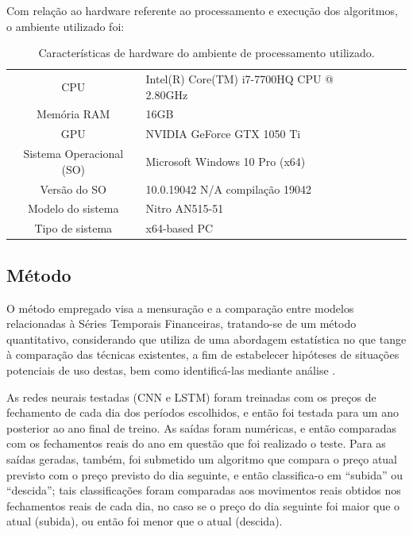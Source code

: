 \par{
Com relação ao hardware referente ao processamento e execução dos algoritmos, o ambiente utilizado foi:}


\begin{table}[htp]
\footnotesize
\centering
\caption{Características de hardware do ambiente de processamento utilizado.}
\begin{tabular}{llcll}
\cline{1-2}
\multicolumn{1}{c|}{CPU} & Intel(R) Core(TM) i7-7700HQ CPU @ 2.80GHz & \textbf{} &  &  \\
\multicolumn{1}{c|}{Memória RAM} & 16GB &  &  &  \\
\multicolumn{1}{c|}{GPU} & NVIDIA GeForce GTX 1050 Ti &  &  &  \\
\multicolumn{1}{c|}{Sistema Operacional (SO)} & Microsoft Windows 10 Pro (x64) &  &  &  \\
\multicolumn{1}{c|}{Versão do SO} & 10.0.19042 N/A compilação 19042 &  &  &  \\
\multicolumn{1}{c|}{Modelo do sistema} & Nitro AN515-51 &  &  &  \\
\multicolumn{1}{c|}{Tipo de sistema} & x64-based PC &  &  &  \\ \cline{1-2}
\end{tabular}
\end{table}


\subsection{\textbf{Método}}

\par
O método empregado visa a mensuração e a comparação entre modelos relacionadas à Séries Temporais Financeiras, tratando-se de um método quantitativo, considerando que utiliza de uma abordagem estatística no que tange à comparação das técnicas existentes, a fim de estabelecer hipóteses de situações potenciais de uso destas, bem como identificá-las mediante análise \cite{wainer}.

\par
As redes neurais testadas (CNN e LSTM) foram treinadas com os preços de fechamento de cada dia dos períodos escolhidos, e então foi testada para um ano posterior ao ano final de treino. As saídas foram numéricas, e então comparadas com os fechamentos reais do ano em questão que foi realizado o teste. Para as saídas geradas, também, foi submetido um algoritmo que compara o preço atual previsto com o preço previsto do dia seguinte, e então classifica-o em “subida” ou “descida”; tais classificações foram comparadas aos movimentos reais obtidos nos fechamentos reais de cada dia, no caso se o preço do dia seguinte foi maior que o atual (subida), ou então foi menor que o atual (descida).

